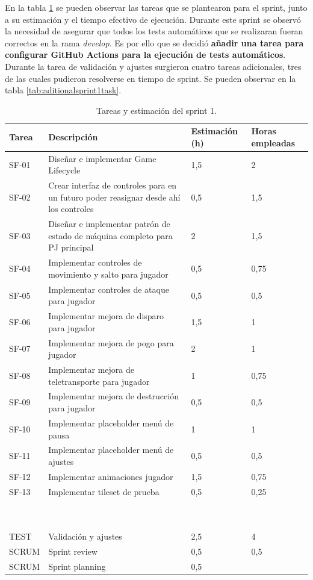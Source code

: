 En la tabla \ref{tab:sprint1task} se pueden observar las tareas que se plantearon para el sprint, junto a su estimación y el tiempo efectivo de ejecución. Durante este sprint se observó la necesidad de asegurar que todos los tests automáticos que se realizaran fueran correctos en la rama \textit{develop}. Es por ello que se decidió \textbf{añadir una tarea para configurar GitHub Actions para la ejecución de tests automáticos}. Durante la tarea de validación y ajustes surgieron cuatro tareas adicionales, tres de las cuales pudieron resolverse en tiempo de sprint. Se pueden observar en la tabla \ref{tab:aditionalsprint1task}.

\begin{table}[htb]
    \centering
    \begin{tabular}{|l|p{8cm}|p{2cm}|p{2cm}|}
    \hline
        Tarea & Descripción & Estimación (h) & Horas empleadas \\ \hline
        SF-01 & Diseñar e implementar Game Lifecycle & 1,5 & 2 \\ \hline
        SF-02 & Crear interfaz de controles para en un futuro poder reasignar desde ahí los controles & 0,5 & 1,5 \\ \hline
        SF-03 & Diseñar e implementar patrón de estado de máquina completo para PJ principal & 2 & 1,5 \\ \hline
        SF-04 & Implementar controles de movimiento y salto para jugador & 0,5 & 0,75 \\ \hline
        SF-05 & Implementar controles de ataque para jugador & 0,5 & 0,5 \\ \hline
        SF-06 & Implementar mejora de disparo para jugador & 1,5 & 1 \\ \hline
        SF-07 & Implementar mejora de pogo para jugador & 2 & 1 \\ \hline
        SF-08 & Implementar mejora de teletransporte para jugador & 1 & 0,75 \\ \hline
        SF-09 & Implementar mejora de destrucción para jugador & 0,5 & 0,5 \\ \hline
        SF-10 & Implementar placeholder menú de pausa & 1 & 1 \\ \hline
        SF-11 & Implementar placeholder menú de ajustes & 0,5 & 0,5 \\ \hline
        SF-12 & Implementar animaciones jugador & 1,5 & 0,75 \\ \hline
        SF-13 & Implementar tileset de prueba & 0,5 & 0,25 \\ \hline
        ~ & ~ & ~ & ~ \\ \hline
        ~ & ~ & ~ & ~ \\ \hline
        TEST & Validación y ajustes & 2,5 & 4 \\ \hline
        SCRUM & Sprint review & 0,5 & 0,5 \\ \hline
        SCRUM & Sprint planning & 0,5 & ~ \\ \hline
    \end{tabular}
    \caption{Tareas y estimación del sprint 1.}
    \label{tab:sprint1task}
\end{table}

